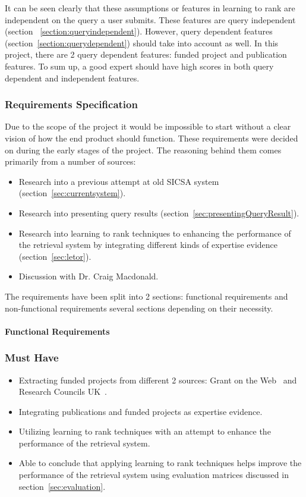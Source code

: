 It can be seen clearly that these assumptions or features in learning to rank are independent on the query a user submits. These features are query independent
(section ~\ref{section:queryindependent}). However, query dependent features (section~\ref{section:querydependent}) should take into account as well. 
In this project, there are 2 query dependent features: funded project and publication features. To sum up, a good expert should have high scores in
both query dependent and independent features.

\subsubsection{Requirements Specification}
Due to the scope of the project it would be impossible to start without a clear vision of how
the end product should function. These requirements were decided on during the early stages of the project. 
The reasoning behind them comes primarily from a number of sources:
\begin{itemize}
 \item Research into a previous attempt at old SICSA system (section~\ref{sec:currentsystem}).
 \item Research into presenting query results (section~\ref{sec:presentingQueryResult}).
 \item Research into learning to rank techniques to enhancing the performance of the retrieval system by integrating different kinds of 
 expertise evidence (section~\ref{sec:letor}).
 \item Discussion with Dr. Craig Macdonald.
\end{itemize}
The requirements have been split into 2 sections: functional requirements and non-functional requirements
several sections depending on their necessity.

\paragraph{Functional Requirements}
\subsubsection{Must Have}
\begin{itemize}
 \item Extracting funded projects from different 2 sources: Grant on the Web~\cite{gow} and Research Councils UK~\cite{gtr}.
 \item Integrating publications and funded projects as expertise evidence.
 \item Utilizing learning to rank techniques with an attempt to enhance the performance of the retrieval system.
 \item Able to conclude that applying learning to rank techniques helps improve the performance of the retrieval system using evaluation matrices discussed
 in section~\ref{sec:evaluation}. 
\end{itemize}

